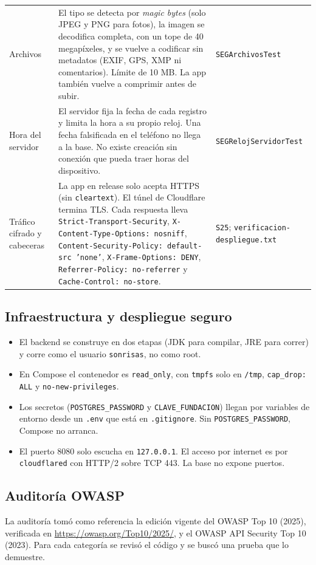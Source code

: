 \begin{longtable}{p{3.2cm}p{7.6cm}p{4.2cm}}
Archivos & El tipo se detecta por \emph{magic bytes} (solo JPEG y PNG para fotos), la imagen se decodifica completa, con un tope de 40 megapíxeles, y se vuelve a codificar sin metadatos (EXIF, GPS, XMP ni comentarios). Límite de 10 MB. La app también vuelve a comprimir antes de subir. & \texttt{SEGArchivos\allowbreak{}Test}\\
Hora del servidor & El servidor fija la fecha de cada registro y limita la hora a su propio reloj. Una fecha falsificada en el teléfono no llega a la base. No existe creación sin conexión que pueda traer horas del dispositivo. & \texttt{SEGReloj\allowbreak{}Servidor\allowbreak{}Test}\\
Tráfico cifrado y cabeceras & La app en release solo acepta HTTPS (sin \texttt{cleartext}). El túnel de Cloudflare termina TLS. Cada respuesta lleva \texttt{Strict-Transport-Security}, \texttt{X-Content-Type-Options: nosniff}, \texttt{Content-Security-Policy: default-src 'none'}, \texttt{X-Frame-Options: DENY}, \texttt{Referrer-Policy: no-referrer} y \texttt{Cache-Control: no-store}. & \texttt{S25}; \texttt{verificacion-despliegue.\allowbreak{}txt}\\
\bottomrule
\end{longtable}

\subsection{Infraestructura y despliegue seguro}
\begin{itemize}
	\item El backend se construye en dos etapas (JDK para compilar, JRE para correr) y corre como el usuario \texttt{sonrisas}, no como root.
	\item En Compose el contenedor es \texttt{read\_only}, con \texttt{tmpfs} solo en \texttt{/\allowbreak{}tmp}, \texttt{cap\_drop: ALL} y \texttt{no-new-privileges}.
	\item Los secretos (\texttt{POSTGRES\_PASSWORD} y \texttt{CLAVE\_FUNDACION}) llegan por variables de entorno desde un \texttt{.\allowbreak{}env} que está en \texttt{.\allowbreak{}gitignore}. Sin \texttt{POSTGRES\_PASSWORD}, Compose no arranca.
	\item El puerto 8080 solo escucha en \texttt{127.\allowbreak{}0.\allowbreak{}0.\allowbreak{}1}. El acceso por internet es por \texttt{cloudflared} con HTTP/2 sobre TCP 443. La base no expone puertos.
\end{itemize}

\subsection{Auditoría OWASP}
La auditoría tomó como referencia la edición vigente del OWASP Top 10 (2025), verificada en \url{https://owasp.org/Top10/2025/}, y el OWASP API Security Top 10 (2023). Para cada categoría se revisó el código y se buscó una prueba que lo demuestre.

